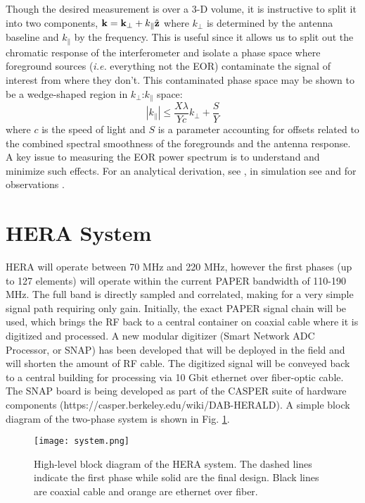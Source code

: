 \documentclass{ICEAA-IEEE_APWC}
\newcommand{\kvec}{{\bf k}}
\newcommand{\kpr}{{k_\perp}}
\newcommand{\kvpr}{{\kvec_\perp}}
\newcommand{\kpar}{{k_\parallel}}
\begin{document}
Though the desired measurement is over a 3-D volume, it is instructive to split it into two components,  $\kvec =  \kvpr + \kpar{\hat {\bf z}}$ where $\kpr$ is determined by the antenna baseline and $\kpar$ by the frequency.  This is useful since it allows us to split out the chromatic response of the interferometer and isolate a phase space where foreground sources ({\em i.e.} everything not the EOR) contaminate the signal of interest from where they don't.  This contaminated phase space may be shown to be a wedge-shaped region in $\kpr$:$\kpar$ space:
\begin{equation}
|\kpar| \le \frac{X\lambda}{Yc}\kpr + \frac{S}{Y}
\end{equation}
where $c$ is the speed of light and $S$ is a parameter accounting for offsets related to the combined spectral smoothness of the foregrounds and the antenna response.  
A key issue to measuring the EOR power spectrum is to understand and minimize such effects.  For an analytical derivation, see \cite{2012ApJ...756..165P,vedantham_et_al2012,liu_et_al2014b},  in simulation see \cite{datta_et_al2010,hazelton_et_al2013} and for observations
\cite{2013ApJ...768L..36P,2015arXiv150601026P,2014ApJ...788..106P,2015arXiv150206016A}.

\section{HERA System}
\label{sec:system}
HERA will operate between 70 MHz and 220 MHz, however the first phases (up to 127 elements) will operate within the current PAPER bandwidth of 110-190 MHz.  The full band is directly sampled and correlated, making for a very simple signal path requiring only gain.  Initially, the exact PAPER signal chain will be used, which brings the RF back to a central container on coaxial cable where it is digitized and processed.  A new modular digitizer (Smart Network ADC Processor, or SNAP) has been developed that will be deployed in the field and will shorten the amount of RF cable.  The digitized signal will be conveyed back to a central building for processing via 10 Gbit ethernet over fiber-optic cable.   The SNAP board is being developed as part of the CASPER suite of hardware components (https://casper.berkeley.edu/wiki/DAB-HERALD).  A simple block diagram of the two-phase system is shown in Fig. \ref{fig:system}.

\begin{figure}[t]
\centerline{
\texttt{[image: system.png]} }
\caption{\small High-level block diagram of the HERA system.  The dashed lines indicate the first phase while solid are the final design.  Black lines are coaxial cable and orange are ethernet over fiber.
\label{fig:system}}
\end{figure}
\end{document}
